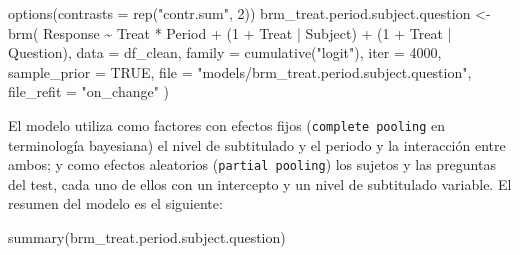 \documentclass[
  12pt,
  a4paper,
  extrafontsizes,
  onecolumn,
  openright,
  table]{memoir}
\newenvironment{Shaded}{\begin{snugshade}}{\end{snugshade}}
\newcommand{\AttributeTok}[1]{\textcolor[rgb]{0.40,0.45,0.13}{#1}}
\newcommand{\ConstantTok}[1]{\textcolor[rgb]{0.56,0.35,0.01}{#1}}
\newcommand{\DecValTok}[1]{\textcolor[rgb]{0.68,0.00,0.00}{#1}}
\newcommand{\FunctionTok}[1]{\textcolor[rgb]{0.28,0.35,0.67}{#1}}
\newcommand{\NormalTok}[1]{\textcolor[rgb]{0.00,0.23,0.31}{#1}}
\newcommand{\OtherTok}[1]{\textcolor[rgb]{0.00,0.23,0.31}{#1}}
\newcommand{\SpecialCharTok}[1]{\textcolor[rgb]{0.37,0.37,0.37}{#1}}
\newcommand{\StringTok}[1]{\textcolor[rgb]{0.13,0.47,0.30}{#1}}
\begin{document}
\scriptsize

\begin{Shaded}
\begin{Highlighting}[]
\FunctionTok{options}\NormalTok{(}\AttributeTok{contrasts =} \FunctionTok{rep}\NormalTok{(}\StringTok{"contr.sum"}\NormalTok{, }\DecValTok{2}\NormalTok{))}
\NormalTok{brm\_treat.period.subject.question }\OtherTok{\textless{}{-}} \FunctionTok{brm}\NormalTok{(}
\NormalTok{    Response }\SpecialCharTok{\textasciitilde{}}\NormalTok{ Treat }\SpecialCharTok{*}\NormalTok{ Period }\SpecialCharTok{+}\NormalTok{ (}\DecValTok{1} \SpecialCharTok{+}\NormalTok{ Treat }\SpecialCharTok{|}\NormalTok{ Subject) }\SpecialCharTok{+}\NormalTok{ (}\DecValTok{1} \SpecialCharTok{+}\NormalTok{ Treat }\SpecialCharTok{|}\NormalTok{ Question),}
    \AttributeTok{data =}\NormalTok{ df\_clean,}
    \AttributeTok{family =} \FunctionTok{cumulative}\NormalTok{(}\StringTok{"logit"}\NormalTok{),}
    \AttributeTok{iter =} \DecValTok{4000}\NormalTok{,}
    \AttributeTok{sample\_prior =} \ConstantTok{TRUE}\NormalTok{,}
    \AttributeTok{file =} \StringTok{"models/brm\_treat.period.subject.question"}\NormalTok{,}
    \AttributeTok{file\_refit =} \StringTok{"on\_change"}
\NormalTok{)}
\end{Highlighting}
\end{Shaded}

\normalsize

El modelo utiliza como factores con efectos fijos
(\texttt{complete\ pooling} en terminología bayesiana) el nivel de
subtitulado y el periodo y la interacción entre ambos; y como efectos
aleatorios (\texttt{partial\ pooling}) los sujetos y las preguntas del
test, cada uno de ellos con un intercepto y un nivel de subtitulado
variable. El resumen del modelo es el siguiente:

\tiny

\begin{Shaded}
\begin{Highlighting}[]
\FunctionTok{summary}\NormalTok{(brm\_treat.period.subject.question)}
\end{Highlighting}
\end{Shaded}
\end{document}
